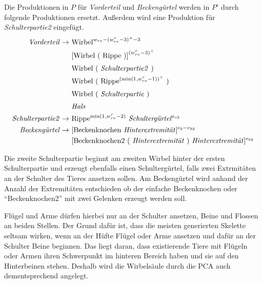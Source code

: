 Die Produktionen in $P$ für \emph{Vorderteil} und \emph{Beckengürtel} werden in $P'$ durch folgende Produktionen ersetzt. Außerdem wird eine Produktion für \emph{Schulterpartie2} eingefügt. 
\begin{align*}
 \text{\emph{Vorderteil}} \rightarrow &\text{ Wirbel}^{w_{rv} - (w_{rv}^r-3)^+ - 3}\\
    &\text{ [Wirbel ( Rippe )]}^{(w_{rv}^r - 3)^+}\\
    &\text{ Wirbel ( \emph{Schulterpartie2} )}^{\vphantom{(}}\\
    &\text{ Wirbel ( Rippe$^{(\text{min}(1, w_{rv}^r-1))^+}$ )}\\
    &\text{ Wirbel ( \emph{Schulterpartie} )}^{\vphantom{(}}\\
    &\text{ \emph{Hals}}^{\vphantom{(}}\\
 \text{\emph{Schulterpartie2}} \rightarrow &\text{ Rippe$^{\text{min}(1,w_{rv}^r-2)}$ \emph{Schultergürtel}$^{e_{s2}}$}\\ 
 \text{\emph{Beckengürtel}} \rightarrow &\text{ [Beckenknochen \emph{Hinterextremität}]$^{e_b - e_{b2}}$}\\
    &\text{ [Beckenknochen2 ( \emph{Hinterextremität} ) \emph{Hinterextremität}]$^{e_{b2}}$}
\end{align*}

Die zweite Schulterpartie beginnt am zweiten Wirbel hinter der ersten Schulterpartie und erzeugt ebenfalls einen Schultergürtel, falls zwei Extrmitäten an der Schulter des Tieres ansetzen sollen. Am Beckengürtel wird anhand der Anzahl der Extremitäten entschieden ob der einfache Beckenknochen oder "`Beckenknochen2"' mit zwei Gelenken erzeugt werden soll.

Flügel und Arme dürfen hierbei nur an der Schulter ansetzen, Beine und Flossen an beiden Stellen. Der Grund dafür ist, dass die meisten generierten Skelette seltsam wirken, wenn an der Hüfte Flügel oder Arme ansetzen und dafür an der Schulter Beine beginnen. Das liegt daran, dass existierende Tiere mit Flügeln oder Armen ihren Schwerpunkt im hinteren Bereich haben und sie auf den Hinterbeinen stehen. Deshalb wird die Wirbelsäule durch die PCA auch dementsprechend angelegt.

